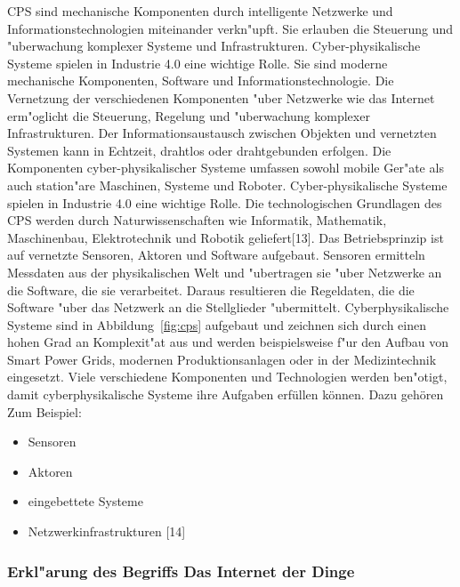  CPS sind mechanische Komponenten 
durch intelligente Netzwerke und Informationstechnologien miteinander verkn"upft.
 Sie erlauben die Steuerung und "uberwachung komplexer Systeme und Infrastrukturen.
 Cyber-physikalische Systeme spielen in Industrie 4.0 eine wichtige Rolle.
 Sie sind moderne mechanische Komponenten, 
 Software und Informationstechnologie. Die Vernetzung der verschiedenen 
 Komponenten "uber Netzwerke wie das Internet erm"oglicht die Steuerung, 
 Regelung und "uberwachung komplexer Infrastrukturen. 
 Der Informationsaustausch zwischen Objekten und vernetzten 
 Systemen kann in Echtzeit, drahtlos oder drahtgebunden erfolgen. 
 Die Komponenten cyber-physikalischer Systeme umfassen sowohl
  mobile Ger"ate als auch station"are Maschinen, Systeme und Roboter. 
  Cyber-physikalische Systeme spielen in Industrie 4.0 eine wichtige 
  Rolle. Die technologischen Grundlagen des CPS werden durch 
  Naturwissenschaften wie Informatik, Mathematik, Maschinenbau, 
  Elektrotechnik und Robotik geliefert[13].\newline
  Das Betriebsprinzip ist auf vernetzte Sensoren, 
  Aktoren und Software aufgebaut. 
  Sensoren ermitteln Messdaten aus der physikalischen Welt 
  und "ubertragen sie "uber Netzwerke an die Software, die sie verarbeitet. 
  Daraus resultieren die Regeldaten, die die Software "uber 
  das Netzwerk an die Stellglieder "ubermittelt. 
  Cyberphysikalische Systeme sind in Abbildung~\ref{fig:cps} aufgebaut 
  und zeichnen sich durch einen hohen Grad 
  an Komplexit"at aus und werden beispielsweise f"ur den Aufbau von Smart Power Grids, 
  modernen Produktionsanlagen oder in der Medizintechnik eingesetzt.
  Viele verschiedene Komponenten und Technologien werden ben"otigt, 
  damit cyberphysikalische Systeme ihre Aufgaben erfüllen können.
   Dazu gehören Zum Beispiel:
 \begin{itemize}
   \item Sensoren
    \item Aktoren 
     \item eingebettete Systeme
      \item Netzwerkinfrastrukturen [14]
    \end{itemize}
   
  
  
  





    
    
 \subsubsection{Erkl"arung des Begriffs Das Internet der Dinge}
 

